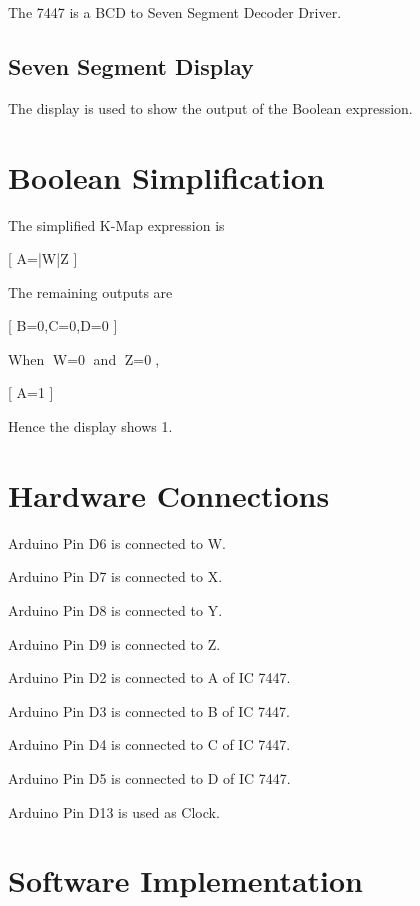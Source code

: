 \documentclass[a4paper,12pt]{article}
\begin{document}
The 7447 is a BCD to Seven Segment Decoder Driver.

\subsection{Seven Segment Display}

The display is used to show the output of the Boolean expression.

\section{Boolean Simplification}

The simplified K-Map expression is

[
A=\bar{W}\bar{Z}
]

The remaining outputs are

[
B=0,\quad C=0,\quad D=0
]

When W=0 and Z=0,

[
A=1
]

Hence the display shows 1.

\section{Hardware Connections}

Arduino Pin D6 is connected to W.

Arduino Pin D7 is connected to X.

Arduino Pin D8 is connected to Y.

Arduino Pin D9 is connected to Z.

Arduino Pin D2 is connected to A of IC 7447.

Arduino Pin D3 is connected to B of IC 7447.

Arduino Pin D4 is connected to C of IC 7447.

Arduino Pin D5 is connected to D of IC 7447.

Arduino Pin D13 is used as Clock.

\section{Software Implementation}
\end{document}
